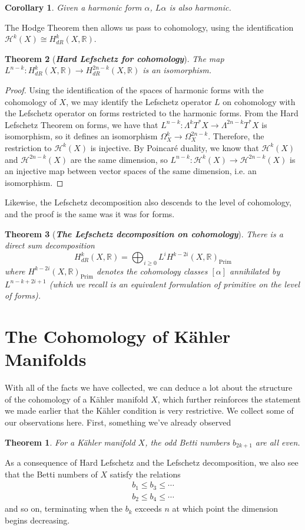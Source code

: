 \documentclass[psamsfonts, 12pt]{amsart}
\newtheorem{thm}{Theorem}[section]
\newtheorem*{thm*}{Theorem}
\newtheorem{cor}[thm]{Corollary}
\theoremstyle{definition}
\theoremstyle{remark}
\newcommand{\R}{\mathbb{R}}
\newcommand{\ib}[1]{\textbf{\textit{#1}}}
\begin{document}
%
\begin{cor}
Given a harmonic form $\alpha$, $L\alpha$ is also harmonic.
\end{cor}
%
The Hodge Theorem then allows us pass to cohomology, using the identification
$\mathcal{H}^k(X) \cong H^k_{dR}(X,\R)$.
%
\begin{thm}[\ib{Hard Lefschetz for cohomology}]
The map $L^{n-k} : H^k_{dR}(X,\R) \to H^{2n-k}_{dR}(X,\R)$ is an isomorphism.
\end{thm}
%
\begin{proof}
Using the identification of the spaces of harmonic forms with the cohomology of $X$,
we may identify the Lefschetz operator $L$ on cohomology with the Lefschetz operator
on forms restricted to the harmonic forms. From the Hard Lefschetz Theorem on
forms, we have that $L^{n-k} : \Lambda^kT^*X \to \Lambda^{2n-k}T^*X$ is isomorphism,
so it defines an isomorphism $\Omega^k_X \to \Omega^{2n-k}_X$. Therefore, the
restriction to $\mathcal{H}^k(X)$ is injective. By Poincar\'e duality, we know
that $\mathcal{H}^k(X)$ and $\mathcal{H}^{2n-k}(X)$ are the same dimension, so
$L^{n-k} : \mathcal{H}^k(X) \to \mathcal{H}^{2n-k}(X)$ is an injective map between
vector spaces of the same dimension, i.e. an isomorphism.
\end{proof}
%
Likewise, the Lefschetz decomposition also descends to the level of cohomology, and the
proof is the same was it was for forms.
%
\begin{thm}[\ib{The Lefschetz decomposition on cohomology}]
There is a direct sum decomposition
\[
H^k_{dR}(X,\R) = \bigoplus_{i \geq 0}L^iH^{k-2i}(X,\R)_{\mathrm{Prim}}
\]
where $H^{k-2i}(X,\R)_{\mathrm{Prim}}$ denotes the cohomology classes $[\alpha]$
annihilated by $L^{n-k+2i+1}$ (which we recall is an equivalent formulation of
primitive on the level of forms).
\end{thm}
\section{The Cohomology of K\"ahler Manifolds}
%

With all of the facts we have collected, we can deduce a lot about the structure of
the cohomology of a K\"ahler manifold $X$, which further reinforces the statement we
made earlier that the K\"ahler condition is very restrictive. We collect some of
our observations here. First, something we've already observed
%
\begin{thm*}
For a K\"ahler manifold $X$, the odd Betti numbers $b_{2k+1}$ are all even.
\end{thm*}
%
As a consequence of Hard Lefschetz and the Lefschetz decomposition, we also see that
the Betti numbers of $X$ satisfy the relations
\begin{align*}
b_1 \leq b_3 \leq \cdots \\
b_2 \leq b_4 \leq \cdots
\end{align*}
and so on, terminating when the $b_k$ exceeds $n$ at which point the dimension begins
decreasing. \\
\end{document}
